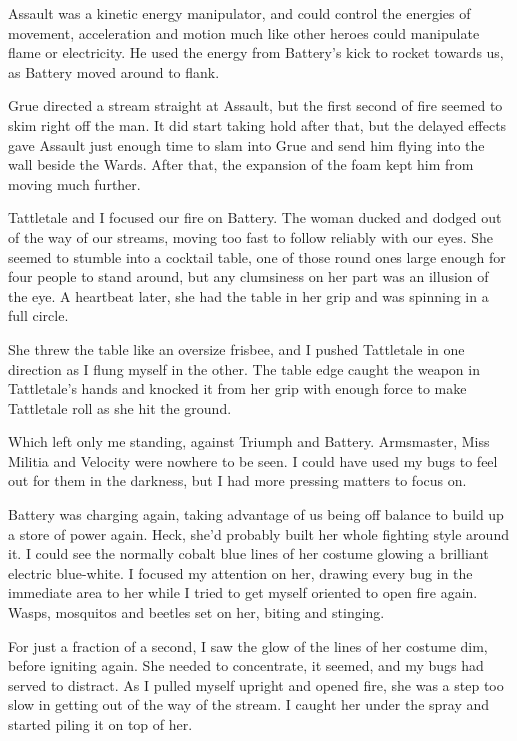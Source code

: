 Assault was a kinetic energy manipulator, and could control the energies of movement, acceleration and motion much like other heroes could manipulate flame or electricity.  He used the energy from Battery's kick to rocket towards us, as Battery moved around to flank.



Grue directed a stream straight at Assault, but the first second of fire seemed to skim right off the man.  It did start taking hold after that, but the delayed effects gave Assault just enough time to slam into Grue and send him flying into the wall beside the Wards.  After that, the expansion of the foam kept him from moving much further.



Tattletale and I focused our fire on Battery.  The woman ducked and dodged out of the way of our streams, moving too fast to follow reliably with our eyes.  She seemed to stumble into a cocktail table, one of those round ones large enough for four people to stand around, but any clumsiness on her part was an illusion of the eye.  A heartbeat later, she had the table in her grip and was spinning in a full circle.



She threw the table like an oversize frisbee, and I pushed Tattletale in one direction as I flung myself in the other.  The table edge caught the weapon in Tattletale's hands and knocked it from her grip with enough force to make Tattletale roll as she hit the ground.



Which left only me standing, against Triumph and Battery.  Armsmaster, Miss Militia and Velocity were nowhere to be seen.  I could have used my bugs to feel out for them in the darkness, but I had more pressing matters to focus on.



Battery was charging again, taking advantage of us being off balance to build up a store of power again.  Heck, she'd probably built her whole fighting style around it.  I could see the normally cobalt blue lines of her costume glowing a brilliant electric blue-white.  I focused my attention on her, drawing every bug in the immediate area to her while I tried to get myself oriented to open fire again.  Wasps, mosquitos and beetles set on her, biting and stinging.



For just a fraction of a second, I saw the glow of the lines of her costume dim, before igniting again.  She needed to concentrate, it seemed, and my bugs had served to distract.  As I pulled myself upright and opened fire, she was a step too slow in getting out of the way of the stream.  I caught her under the spray and started piling it on top of her.



